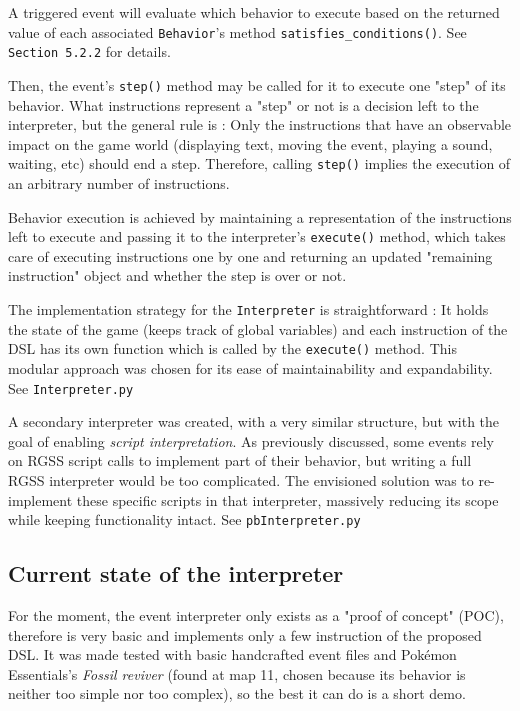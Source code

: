 \documentclass[11pt]{article}
\begin{document}
{A triggered event will evaluate which behavior to execute based on the returned value of each associated \texttt{Behavior}'s method \texttt{satisfies\_conditions()}. See \texttt{Section 5.2.2} for details. 

Then, the event's \texttt{step()} method may be called for it to execute one "step" of its behavior. What instructions represent a "step" or not is a decision left to the interpreter, but the general rule is : Only the instructions that have an observable impact on the game world (displaying text, moving the event, playing a sound, waiting, etc) should end a step. Therefore, calling \texttt{step()} implies the execution of an arbitrary number of instructions.

Behavior execution is achieved by maintaining a representation of the instructions left to execute and passing it to the interpreter's \texttt{execute()} method, which takes care of executing instructions one by one and returning an updated "remaining instruction" object and whether the step is over or not.

The implementation strategy for the \texttt{Interpreter} is straightforward : It holds the state of the game (keeps track of global variables) and each instruction of the DSL has its own function which is called by the \texttt{execute()} method. This modular approach was chosen for its ease of maintainability and expandability.  See \texttt{Interpreter.py}

A secondary interpreter was created, with a very similar structure, but with the goal of enabling \textit{script interpretation}. As previously discussed, some events rely on RGSS script calls to implement part of their behavior, but writing a full RGSS interpreter would be too complicated. The envisioned solution was to re-implement these specific scripts in that interpreter, massively reducing its scope while keeping functionality intact. See \texttt{pbInterpreter.py}


\subsection{Current state of the interpreter}

For the moment, the event interpreter only exists as a "proof of concept" (POC), therefore is very basic and implements only a few instruction of the proposed DSL. It was made tested with basic handcrafted event files and Pokémon Essentials's \textit{Fossil reviver} (found at map 11, chosen because its behavior is neither too simple nor too complex), so the best it can do is a short demo.

}
\end{document}
